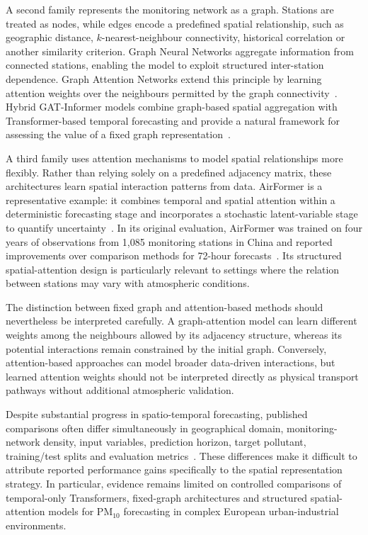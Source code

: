 \documentclass[11pt]{article}
\newenvironment{revnewblock}{%
  \begingroup\color{orange!75!black}%
}{%
  \endgroup%
}
\begin{document}
\begin{revnewblock}
A second family represents the monitoring network as a graph. Stations are treated as nodes, while edges encode a predefined spatial relationship, such as geographic distance, $k$-nearest-neighbour connectivity, historical correlation or another similarity criterion. Graph Neural Networks aggregate information from connected stations, enabling the model to exploit structured inter-station dependence. Graph Attention Networks extend this principle by learning attention weights over the neighbours permitted by the graph connectivity~\cite{Velickovic2018}. Hybrid GAT-Informer models combine graph-based spatial aggregation with Transformer-based temporal forecasting and provide a natural framework for assessing the value of a fixed graph representation~\cite{YU2023110864}.

A third family uses attention mechanisms to model spatial relationships more flexibly. Rather than relying solely on a predefined adjacency matrix, these architectures learn spatial interaction patterns from data. AirFormer is a representative example: it combines temporal and spatial attention within a deterministic forecasting stage and incorporates a stochastic latent-variable stage to quantify uncertainty~\cite{liang2022airformer}. In its original evaluation, AirFormer was trained on four years of observations from 1,085 monitoring stations in China and reported improvements over comparison methods for 72-hour forecasts~\cite{liang2022airformer}. Its structured spatial-attention design is particularly relevant to settings where the relation between stations may vary with atmospheric conditions.

The distinction between fixed graph and attention-based methods should nevertheless be interpreted carefully. A graph-attention model can learn different weights among the neighbours allowed by its adjacency structure, whereas its potential interactions remain constrained by the initial graph. Conversely, attention-based approaches can model broader data-driven interactions, but learned attention weights should not be interpreted directly as physical transport pathways without additional atmospheric validation.

Despite substantial progress in spatio-temporal forecasting, published comparisons often differ simultaneously in geographical domain, monitoring-network density, input variables, prediction horizon, target pollutant, training/test splits and evaluation metrics~\cite{Agbehadji2024,Chen2024}. These differences make it difficult to attribute reported performance gains specifically to the spatial representation strategy. In particular, evidence remains limited on controlled comparisons of temporal-only Transformers, fixed-graph architectures and structured spatial-attention models for PM$_{10}$ forecasting in complex European urban-industrial environments.


\end{revnewblock}
\end{document}
